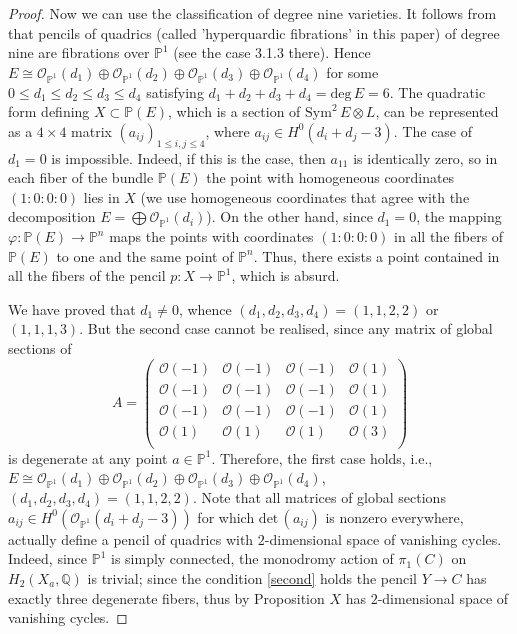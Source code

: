 \documentclass[a4paper]{amsart}
\theoremstyle{plain}
\theoremstyle{definition}
\begin{document}
\begin{proof}
    Now we can use the classification of degree nine varieties.
    It follows from \cite{Livorni} that pencils of quadrics (called 'hyperquardic fibrations' in this paper) of degree nine are fibrations over $\mathbb P^1$ (see the case 3.1.3 there).
    Hence $E \cong \mathcal O_{\mathbb P^1}(d_1) \oplus \mathcal O_{\mathbb P^1}(d_2) \oplus \mathcal O_{\mathbb P^1}(d_3) \oplus \mathcal O_{\mathbb P^1}(d_4)$ for some $0\leq d_1 \leq d_2 \leq d_3 \leq d_4$ satisfying $d_1+d_2+d_3+d_4=\mathrm{deg}\, E = 6$.
    The quadratic form defining $X\subset \mathbb P(E)$, which is a section of $\mathrm{Sym}^2\, E \otimes L$, can be represented as a $4\times 4$ matrix $(a_{ij})_{1\leq i, j \leq 4}$, where $a_{ij} \in H^0(d_i+d_j - 3)$.
    The case of $d_1=0$ is impossible. Indeed, if this is the
    case, then $a_{11}$ is identically zero, so in each fiber of the bundle $\mathbb P(E)$ the point
    with homogeneous coordinates $(1 : 0 : 0 : 0)$ lies in $X$ (we use homogeneous
    coordinates that agree with the decomposition $E = \bigoplus \mathcal O_{\mathbb P^1}(d_i)$). On the
    other hand, since $d_1 = 0$, the mapping $\varphi\colon \mathbb P(E) \to \mathbb P^n$ maps the points with
    coordinates $(1 : 0 : 0 : 0)$ in all the fibers of $\mathbb P(E)$ to one and the same point of $\mathbb P^n$.
    Thus, there exists a point contained in all the fibers of the pencil
    $p\colon X \to \mathbb P^1$, which is absurd.

    We have proved that $d_1 \neq 0$, whence $(d_1, d_2, d_3, d_4) = (1, 1, 2, 2)$ or $(1,1,1,3)$.
    But the second case cannot be realised, since any matrix of global sections of
    \begin{equation*}
        A=\begin{pmatrix}
            \mathcal O(-1)&\mathcal O(-1)&\mathcal O(-1)    &\mathcal O(1)   \\
            \mathcal O(-1)&\mathcal O(-1)&\mathcal O(-1)    &\mathcal O(1)  \\
            \mathcal O(-1)  &\mathcal O(-1)  &\mathcal O(-1)&\mathcal O(1)\\
            \mathcal O(1)   &\mathcal O(1)  &\mathcal O(1)&\mathcal O(3)\\
        \end{pmatrix}
    \end{equation*}
    is degenerate at any point $a \in \mathbb P^1$.
    Therefore, the first case holds, i.e., $E \cong \mathcal O_{\mathbb P^1}(d_1) \oplus \mathcal O_{\mathbb P^1}(d_2) \oplus \mathcal O_{\mathbb P^1}(d_3) \oplus \mathcal O_{\mathbb P^1}(d_4)$, $(d_1, d_2, d_3, d_4) = (1,1,2,2)$.
    Note that all matrices of global sections $a_{ij} \in H^0(\mathcal O_{\mathbb P^1}(d_i+d_j-3))$ for which $\mathrm{det}\, (a_{ij})$ is nonzero everywhere, actually define a pencil of quadrics with $2$-dimensional space of vanishing cycles.
    Indeed, since $\mathbb P^1$ is simply connected, the monodromy action of $\pi_1(C)$ on $H_2(X_a, \mathbb Q)$ is trivial; since the condition \ref{second} holds the pencil $Y \to C$ has exactly three degenerate fibers,
    thus by Proposition \cite[Proposition 5.13]{Lvovski} $X$ has $2$-dimensional space of vanishing cycles.
\end{proof}


\end{document}
